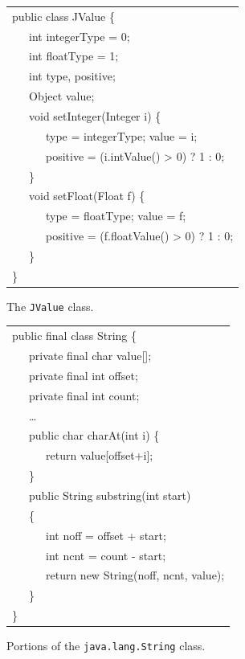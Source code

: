 \documentclass{sig-alt-full}
\begin{document}
\begin{figure}[tp]
\renewcommand{\baselinestretch}{0.6}%
{\small\tt\renewcommand{\>}{~~~}\begin{tabular}[t]{l}%
public class JValue \{ \\
\>int integerType = 0;\\
\>int floatType = 1;\\
\>int type, positive;\\
\>Object value;\\
\>void setInteger(Integer i) \{ \\
\>\>type = integerType; value = i;\\
\>\>positive = (i.intValue() > 0) ? 1 : 0;\\
\>\}\\
\>void setFloat(Float f) \{ \\
\>\>type = floatType; value = f;\\
\>\>positive = (f.floatValue() > 0) ? 1 : 0;\\
\>\}\\
\}
\end{tabular}}%
\caption{The {\tt JValue} class.}
\label{fig:value}
\end{figure}
\begin{figure}[tp]
\renewcommand{\baselinestretch}{0.6}%
{\small\tt\renewcommand{\>}{~~~}\begin{tabular}[t]{l}%
public final class String \{\\
\>private final char value[];\\
\>private final int offset;\\
\>private final int count;\\
\>\ldots\\
\>public char charAt(int i) \{\\
\>\>return value[offset+i];\\
\>\}\\
\>public String substring(int start)\\
\>\{\\
\>\>int noff = offset + start;\\
\>\>int ncnt = count - start;\\
\>\>return new String(noff, ncnt, value);\\
\>\}\\
\}\\
\end{tabular}}%
\caption{Portions of the {\tt java.lang.String} class.}
\label{fig:string}
\end{figure}
\end{document}
